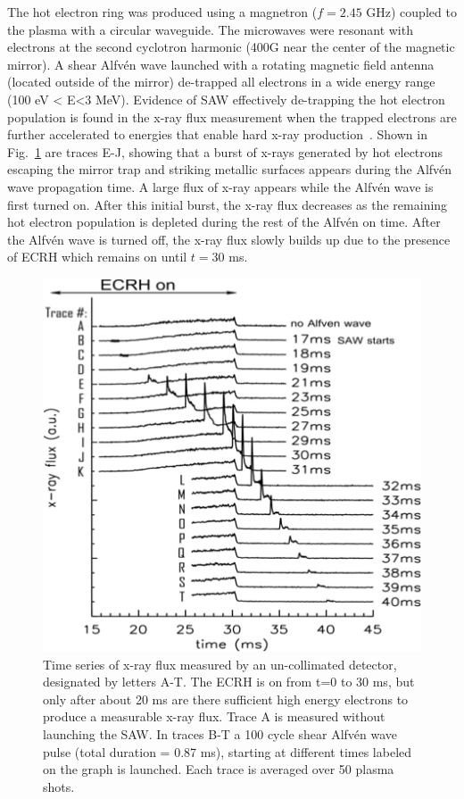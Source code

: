 \documentclass[11pt]{article}
\renewcommand{\cite}{\citep}
\begin{document}
The hot electron ring was produced using a magnetron ($f=2.45$ GHz)
coupled to the plasma with a circular waveguide. The microwaves were
resonant with electrons at the second cyclotron harmonic (400G  near
the center of the magnetic mirror). A shear Alfv\'{e}n wave launched with a
rotating magnetic field antenna (located outside of the mirror)
de-trapped all electrons in a wide energy range (100 eV \textless{}
E\textless{}3 MeV). Evidence of SAW effectively de-trapping the hot
electron population is found in the x-ray flux measurement when the
trapped electrons are further accelerated to energies that enable hard
x-ray production~\cite{wang:2012}. Shown in Fig.~\ref{muri1} are
traces E-J, showing  that a burst of x-rays
generated by hot electrons escaping the mirror trap and striking
metallic surfaces appears during the Alfv\'{e}n wave propagation time. A
large flux of x-ray appears while the Alfv\'{e}n wave is first turned on.
After this initial burst, the x-ray flux decreases as the remaining hot
electron population is depleted during the rest of the Alfv\'{e}n on time.
After the Alfv\'{e}n wave is turned off, the x-ray flux slowly builds up due
to the presence of ECRH which remains on until $t = 30$ ms.

\begin{figure}[!htbp]
\centerline{\includegraphics[width=3.5truein]{muri1}}
\caption{Time series of x-ray flux
measured by an un-collimated detector, designated by letters A-T. The
ECRH is on from t=0 to 30 ms, but only after about 20 ms are there
sufficient high energy electrons to produce a measurable x-ray flux.
Trace A is measured without launching the SAW. In traces B-T a 100 cycle
shear Alfvén wave pulse (total duration = 0.87 ms), starting at
different times labeled on the graph is launched. Each trace is averaged
over 50 plasma shots.}\label{muri1}
\end{figure}
\end{document}
